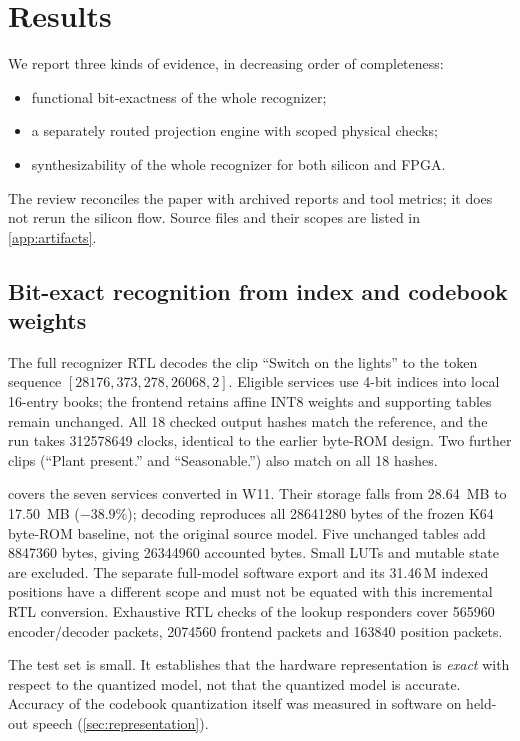 \section{Results}
\label{sec:results}

We report three kinds of evidence, in decreasing order of completeness:
\begin{itemize}
\item functional bit-exactness of the whole recognizer;
\item a separately routed projection engine with scoped physical checks;
\item synthesizability of the whole recognizer for both silicon and FPGA.
\end{itemize}
The review reconciles the paper with archived reports and tool metrics; it does not rerun the silicon flow. Source files and their scopes are listed in \cref{app:artifacts}.

\subsection{Bit-exact recognition from index and codebook weights}
The full recognizer RTL decodes the clip ``Switch on the lights'' to the token sequence $[28176, 373, 278, 26068, 2]$. Eligible services use 4-bit indices into local 16-entry books; the frontend retains affine INT8 weights and supporting tables remain unchanged. All 18 checked output hashes match the reference, and the run takes \num{312578649} clocks, identical to the earlier byte-ROM design. Two further clips (``Plant present.'' and ``Seasonable.'') also match on all 18 hashes.

 covers the seven services converted in W11. Their storage falls from \SI{28.64}{MB} to \SI{17.50}{MB} ($-38.9\%$); decoding reproduces all \num{28641280} bytes of the frozen K64 byte-ROM baseline, not the original source model. Five unchanged tables add \num{8847360} bytes, giving \num{26344960} accounted bytes. Small LUTs and mutable state are excluded. The separate full-model software export and its 31.46\,M indexed positions have a different scope and must not be equated with this incremental RTL conversion. Exhaustive RTL checks of the lookup responders cover \num{565960} encoder/decoder packets, \num{2074560} frontend packets and \num{163840} position packets.

The test set is small. It establishes that the hardware representation is \emph{exact} with respect to the quantized model, not that the quantized model is accurate. Accuracy of the codebook quantization itself was measured in software on held-out speech (\cref{sec:representation}).

